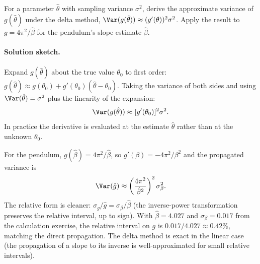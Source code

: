 \begin{exercise}
For a parameter $\hat\theta$ with sampling variance $\sigma^{2}$,
derive the approximate variance of $g(\hat\theta)$ under the
delta method, $\Var(g(\hat\theta)) \approx (g'(\theta))^{2}
\sigma^{2}$. Apply the result to $g = 4\pi^{2}/\hat\beta$ for
the pendulum's slope estimate $\hat\beta$.

\paragraph{Solution sketch.} Expand $g(\hat\theta)$ about the true
value $\theta_{0}$ to first order:
$g(\hat\theta) \approx g(\theta_{0}) + g'(\theta_{0})
(\hat\theta - \theta_{0})$. Taking the variance of both sides and
using $\Var(\hat\theta) = \sigma^{2}$ plus the linearity of the
expansion:
\[
\Var(g(\hat\theta)) \approx [g'(\theta_{0})]^{2} \sigma^{2}.
\]
In practice the derivative is evaluated at the estimate
$\hat\theta$ rather than at the unknown $\theta_{0}$.

For the pendulum, $g(\hat\beta) = 4\pi^{2}/\hat\beta$, so
$g'(\beta) = -4\pi^{2}/\beta^{2}$ and the propagated variance is
\[
\Var(\hat g) \approx \left(\frac{4\pi^{2}}{\hat\beta^{2}}\right)^{2}
\sigma_{\beta}^{2}.
\]
The relative form is cleaner:
$\sigma_{g}/\hat g = \sigma_{\beta}/\hat\beta$ (the inverse-power
transformation preserves the relative interval, up to sign). With
$\hat\beta = 4.027$ and $\sigma_{\beta} = 0.017$ from the
calculation exercise, the relative interval on $g$ is $0.017/4.027
\approx 0.42\%$, matching the direct propagation. The delta method
is exact in the linear case (the propagation of a slope to its
inverse is well-approximated for small relative intervals).
\end{exercise}

